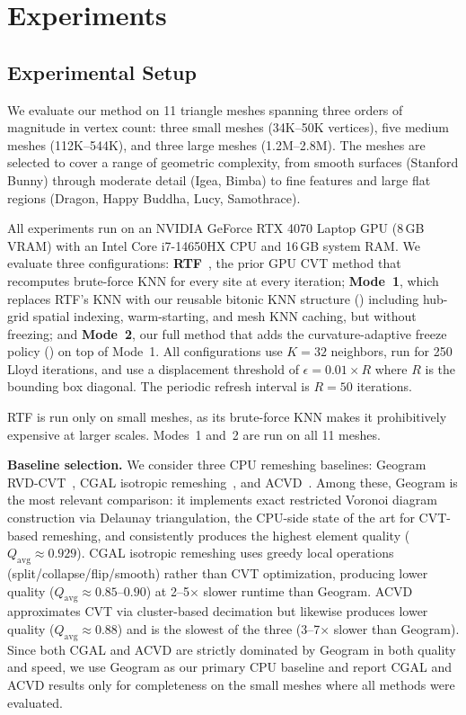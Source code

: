 \section{Experiments}
\label{sec:experiments}

\subsection{Experimental Setup}
\label{sec:setup}

We evaluate our method on 11 triangle meshes spanning three orders of magnitude in vertex count: three small meshes (34K--50K vertices), five medium meshes (112K--544K), and three large meshes (1.2M--2.8M). The meshes are selected to cover a range of geometric complexity, from smooth surfaces (Stanford Bunny) through moderate detail (Igea, Bimba) to fine features and large flat regions (Dragon, Happy Buddha, Lucy, Samothrace).

All experiments run on an NVIDIA GeForce RTX 4070 Laptop GPU (8\,GB VRAM) with an Intel Core i7-14650HX CPU and 16\,GB system RAM. We evaluate three configurations: \textbf{RTF}~\cite{yao2023rtf}, the prior GPU CVT method that recomputes brute-force KNN for every site at every iteration; \textbf{Mode~1}, which replaces RTF's KNN with our reusable bitonic KNN structure () including hub-grid spatial indexing, warm-starting, and mesh KNN caching, but without freezing; and \textbf{Mode~2}, our full method that adds the curvature-adaptive freeze policy () on top of Mode~1. All configurations use $K = 32$ neighbors, run for 250 Lloyd iterations, and use a displacement threshold of $\epsilon = 0.01 \times R$ where $R$ is the bounding box diagonal. The periodic refresh interval is $R = 50$ iterations.

RTF is run only on small meshes, as its brute-force KNN makes it prohibitively expensive at larger scales. Modes~1 and~2 are run on all 11 meshes.

\textbf{Baseline selection.}
We consider three CPU remeshing baselines: Geogram RVD-CVT~\cite{levy2010lp}, CGAL isotropic remeshing~\cite{botsch2004remeshing}, and ACVD~\cite{valette2008acvd}. Among these, Geogram is the most relevant comparison: it implements exact restricted Voronoi diagram construction via Delaunay triangulation, the CPU-side state of the art for CVT-based remeshing, and consistently produces the highest element quality ($Q_{\mathrm{avg}} \approx 0.929$). CGAL isotropic remeshing uses greedy local operations (split/collapse/flip/smooth) rather than CVT optimization, producing lower quality ($Q_{\mathrm{avg}} \approx 0.85$--$0.90$) at 2--5$\times$ slower runtime than Geogram. ACVD approximates CVT via cluster-based decimation but likewise produces lower quality ($Q_{\mathrm{avg}} \approx 0.88$) and is the slowest of the three (3--7$\times$ slower than Geogram). Since both CGAL and ACVD are strictly dominated by Geogram in both quality and speed, we use Geogram as our primary CPU baseline and report CGAL and ACVD results only for completeness on the small meshes where all methods were evaluated.

